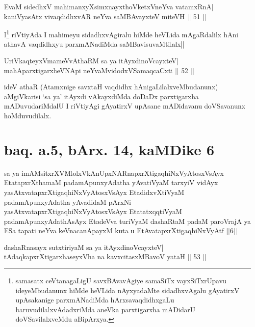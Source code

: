 \begin{shl}
EvaM sidedhxV mahimanxyXsimxnayxthoVketxVneYva vatamxRnA| \\
kaniVyasAtx vivaqdidhxvAR neYva saMBAvayxteV miteVH \hfill ||  51 || 
\end{shl}

\begin{artha} 
I\footnote[1]{samasatx ceVtanagaLigU savxBAvavAgiye samaSiTx 
vayxSiTxrUpavu ideyeMbudanunx hiMde heVLida nAyxyadaMte sidadhxvAgalu 
gAyatirxV upAsakanige parxmANadiMda hArxsavaqdidhxgaLu 
baruvudilalxvAdadxriMda aneVka parxtigarxha mADidarU doVSavilalxveMdu 
aBipArxya.} riVtiyAda I mahimeyu sidadhxvAgiralu hiMde heVLida 
mAgaRdalilx hAni athavA vaqdidhxyu parxmANadiMda saMBavisuvaMtilalx||
\end{artha}


\begin{shl}
UriVkaqteyxVmameVvAthaRM sa ya itAyxdinoVcayxteV| \\
mahAparxtigarxheVNApi neYvaMvidodxVSamaqcaCxti \hfill ||  52 || 
\end{shl}

\begin{artha} 
ideV athaR (Atamxnige savxtaH vaqdidhx hAnigaLilalxveMbudanunx) 
aMgiVkarisi `sa ya' itAyxdi vAkayxdiMda doDaDx parxtigarxha 
mADuvudariMdalU I riVtiyAgi gAyatirxV upAsane mADidavanu doVSavanunx 
hoMduvudilalx. 
\end{artha}

\section*{baq. a.5, bArx. 14, kaMDike 6}

\begin{shl}
sa ya imAMsitxrXVMlolxVkAnUpxNARnapxrXtigaqhiNxVyAtosxV\s sAyx EtatapxrXthamaM padamApunxyAdatha yAvatiVyaM tarxyiV vidAyx yasAtxvatapxrXtigaqhiNxVyAtosxV\s sAyx EtadidxvXtiVyaM padamApunxyAdatha yAvadidaM pArxNi yasAtxvatapxrXtigaqhiNxVyAtosxV\s sAyx EtatatxqqtiVyaM padamApunxyAdathAsAyx EtadeVva turiVyaM dashaRtaM padaM paroVrajA ya ESa tapati neYva keVnacanApayxM kuta u EtAvatapxrXtigaqhiNxVyAtf ||6||
\end{shl}

\begin{shl}
dashaRnasayx sutxtiriyaM sa ya itAyxdinoVcayxteV| \\
tAdaqkapxrXtigarxhaseyxVha na kavxcitasxMBavoV yataH \hfill ||  53 || 
\end{shl}

